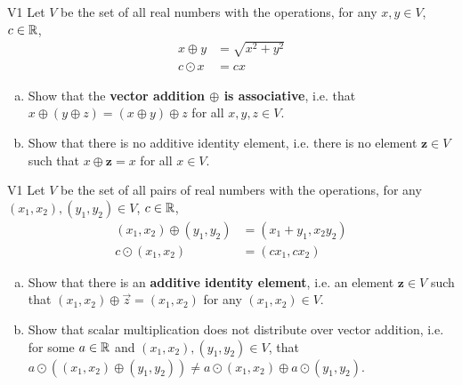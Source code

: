  \begin{problem}{V1}
 Let \(V\) be the set of all real numbers with the operations, for any \(x,y\in V\), \(c\in \mathbb{R}\),
 \begin{align*}
 x \oplus y &= \sqrt{x^2+y^2} \\
 c \odot x &= c x
 \end{align*}
 \begin{enumerate}[(a)]
 \item Show that the \textbf{vector addition \(\oplus\) is associative}, i.e. that \(x \oplus (y \oplus z)=(x\oplus y)\oplus z\) for all \(x,y,z \in V\).

 \item  Show that there is no additive identity element, i.e. there is no element \(\mathbf{z} \in V\) such that \(x \oplus \mathbf{z} = x\) for all \(x \in V\).
 \end{enumerate}
 \end{problem}

 \begin{problem}{V1}
 Let \(V\) be the set of all pairs of real numbers with the operations, for any \((x_1,x_2), (y_1,y_2) \in V\), \(c\in \mathbb{R}\),
 \begin{align*}
 (x_1,x_2) \oplus (y_1,y_2) &= (x_1+y_1,x_2y_2) \\
 c \odot (x_1,x_2) &= (cx_1, cx_2)
 \end{align*}
 \begin{enumerate}[(a)]
 \item Show that there is an \textbf{additive identity element}, i.e. an element \(\mathbf{z} \in V\) such that \((x_1,x_2)\oplus\vec{z}= (x_1,x_2)\) for any \( (x_1,x_2) \in V\).
\item Show that scalar multiplication does not distribute over vector addition, i.e. for some \(a \in \mathbb{R}\) and \( (x_1,x_2), (y_1,y_2) \in V\), that \(a \odot \left( (x_1,x_2)\oplus (y_1,y_2) \right) \neq a \odot (x_1,x_2) \oplus a \odot (y_1,y_2) \).
 \end{enumerate}
\end{problem}
